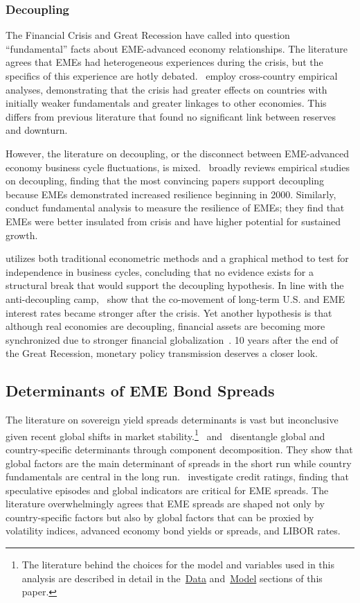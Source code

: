 \documentclass[12pt]{article}
\begin{document}
\subsubsection{Decoupling}
The Financial Crisis and Great Recession have called into question ``fundamental'' facts about EME-advanced economy relationships. The literature agrees that EMEs had heterogeneous experiences during the crisis, but the specifics of this experience are hotly debated.~\textcite{llaudes10} employ cross-country empirical analyses, demonstrating that the crisis had greater effects on countries with initially weaker fundamentals and greater linkages to other economies. This differs from previous literature that found no significant link between reserves and downturn.

However, the literature on decoupling, or the disconnect between EME-advanced economy business cycle fluctuations, is mixed.~\textcite{kuzucu17} broadly reviews empirical studies on decoupling, finding that the most convincing papers support decoupling because EMEs demonstrated increased resilience beginning in 2000. Similarly,~\textcite{kose10} conduct fundamental analysis to measure the resilience of EMEs; they find that EMEs were better insulated from crisis and have higher potential for sustained growth.

\textcite{walti12} utilizes both traditional econometric methods and a graphical method to test for independence in business cycles, concluding that no evidence exists for a structural break that would support the decoupling hypothesis. In line with the anti-decoupling camp,~\textcite{takats14} show that the co-movement of long-term U.S. and EME interest rates became stronger after the crisis. Yet another hypothesis is that although real economies are decoupling, financial assets are becoming more synchronized due to stronger financial globalization~\parencite{yeyati12}. 10 years after the end of the Great Recession, monetary policy transmission deserves a closer look.

\subsection{Determinants of EME Bond Spreads}
The literature on sovereign yield spreads determinants is vast but inconclusive given recent global shifts in market stability.\footnote{The literature behind the choices for the model and variables used in this analysis are described in detail in the~\hyperref[section:data]{Data} and~\hyperref[section:model]{Model} sections of this paper.}~\textcite{csonto13} and~\textcite{bellas10} disentangle global and country-specific determinants through component decomposition. They show that global factors are the main determinant of spreads in the short run while country fundamentals are central in the long run.~\textcite{ozmen16} investigate credit ratings, finding that speculative episodes and global indicators are critical for EME spreads. The literature overwhelmingly agrees that EME spreads are shaped not only by country-specific factors but also by global factors that can be proxied by volatility indices, advanced economy bond yields or spreads, and LIBOR rates.
%
%
%
%
%
\end{document}
